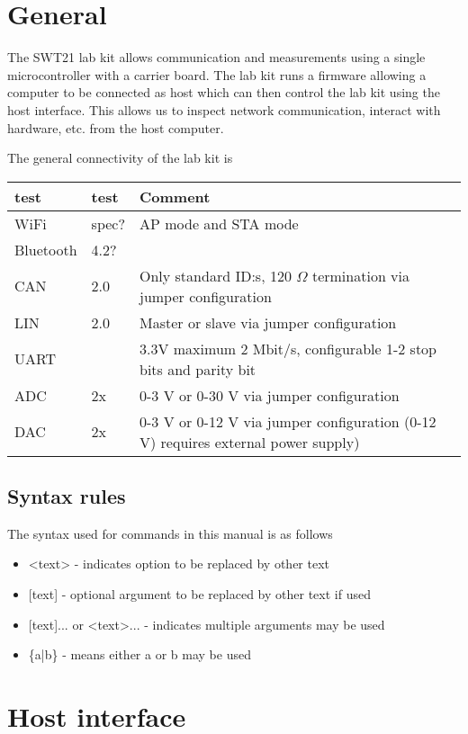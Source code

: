 \documentclass{article}[a4paper]
\begin{document}
\section{General}

The SWT21 lab kit allows communication and measurements using a single
microcontroller with a carrier board. The lab kit runs a firmware allowing a
computer to be connected as host which can then control the lab kit using the
host interface. This allows us to inspect network communication, interact with
hardware, etc. from the host computer.

The general connectivity of the lab kit is

\medskip
\renewcommand{\arraystretch}{1.5}
\begin{tabular}{|p{2cm}|p{1.5cm}|p{7cm}|}
\hline
test & test & Comment \\
\hline
WiFi & spec? & AP mode and STA mode \\
\hline
Bluetooth & 4.2? & \\
\hline
CAN & 2.0 & Only standard ID:s, 120 $\Omega$ termination via jumper configuration \\
\hline
LIN & 2.0 & Master or slave via jumper configuration \\
\hline
UART & & 3.3V maximum 2 Mbit/s, configurable 1-2 stop bits and parity bit \\
\hline
ADC & 2x & 0-3 V or 0-30 V via jumper configuration \\
\hline
DAC & 2x & 0-3 V or 0-12 V via jumper configuration (0-12 V) requires external power supply)\\
\hline
\end{tabular}


\subsection{Syntax rules}
The syntax used for commands in this manual is as follows

\begin{itemize}
\item <text> - indicates option to be replaced by other text
\item{[text] - optional argument to be replaced by other text if used}
\item{[text]... or <text>... - indicates multiple arguments may be used}
\item \{a|b\} - means either a or b may be used
\end{itemize}


\section{Host interface}
\end{document}
